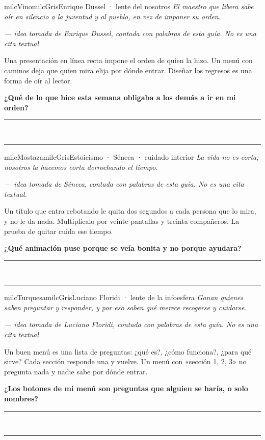 \documentclass[11pt,letterpaper]{article}
\newcommand{\linead}[1]{\noindent\color{milcLinea}\rule{#1}{0.5pt}\color{milcNegro}}
\begin{document}
\begin{softbox}{milcVino}{milcGris}{Enrique Dussel · lente del nosotros}
\textit{El maestro que libera sabe oír en silencio a la juventud y al pueblo, en vez de imponer su orden.}

{\footnotesize\itshape\color{milcNegro!70}--- idea tomada de Enrique Dussel, contada con palabras de esta guía. No es una cita textual.}

Una presentación en línea recta impone el orden de quien la hizo. Un menú con caminos deja que quien mira elija por dónde entrar. Diseñar los regresos es una forma de oír al lector.

\textbf{¿Qué de lo que hice esta semana obligaba a los demás a ir en mi orden?}
\end{softbox}
\linead{\linewidth}\\[1mm]
\linead{\linewidth}

\begin{softbox}{milcMostaza}{milcGris}{Estoicismo · Séneca · cuidado interior}
\textit{La vida no es corta; nosotros la hacemos corta derrochando el tiempo.}

{\footnotesize\itshape\color{milcNegro!70}--- idea tomada de Séneca, contada con palabras de esta guía. No es una cita textual.}

Un título que entra rebotando le quita dos segundos a cada persona que lo mira, y no le da nada. Multiplícalo por veinte pantallas y treinta compañeros. La prueba de quitar cuida ese tiempo.

\textbf{¿Qué animación puse porque se veía bonita y no porque ayudara?}
\end{softbox}
\linead{\linewidth}\\[1mm]
\linead{\linewidth}

\begin{softbox}{milcTurquesa}{milcGris}{Luciano Floridi · lente de la infoesfera}
\textit{Ganan quienes saben preguntar y responder, y por eso saben qué merece recogerse y cuidarse.}

{\footnotesize\itshape\color{milcNegro!70}--- idea tomada de Luciano Floridi, contada con palabras de esta guía. No es una cita textual.}

Un buen menú es una lista de preguntas: ¿qué es?, ¿cómo funciona?, ¿para qué sirve? Cada sección responde una y vuelve. Un menú con «sección 1, 2, 3» no pregunta nada y nadie sabe por dónde entrar.

\textbf{¿Los botones de mi menú son preguntas que alguien se haría, o solo nombres?}
\end{softbox}
\linead{\linewidth}\\[1mm]
\linead{\linewidth}
\end{document}
